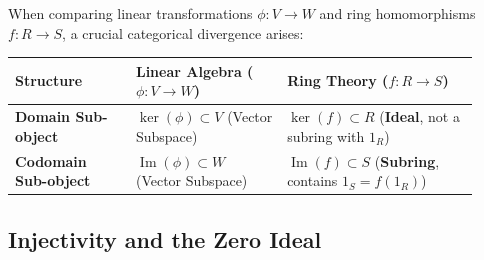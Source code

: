 \begin{content}
When comparing linear transformations $\phi \colon V \to W$ and ring homomorphisms $f \colon R \to S$, a crucial categorical divergence arises:
\begin{center}
\begin{tabular}{@{}L{0.24\linewidth} L{0.30\linewidth} L{0.38\linewidth}@{}}
    \toprule
    \textbf{Structure} & \textbf{Linear Algebra ($\phi \colon V \to W$)} & \textbf{Ring Theory ($f \colon R \to S$)} \\
    \midrule
    \textbf{Domain Sub-object} & $\ker(\phi) \subset V$ (Vector Subspace) & $\ker(f) \subset R$ (\textbf{Ideal}, not a subring with $1_R$) \\
    \textbf{Codomain Sub-object} & $\operatorname{Im}(\phi) \subset W$ (Vector Subspace) & $\operatorname{Im}(f) \subset S$ (\textbf{Subring}, contains $1_S = f(1_R)$) \\
    \bottomrule
\end{tabular}
\end{center}

\end{content}

\begin{hidden}
\end{hidden}

\subsection{Injectivity and the Zero Ideal}

